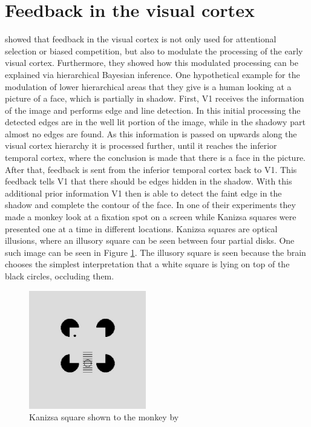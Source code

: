 \section{Feedback in the visual cortex}
\label{section:feedbackInVisualCortex}
\citet{HierachicalBayesVisualCortex} showed that feedback in the visual cortex is not only used for attentional selection or biased competition, but also to modulate the processing of the early visual cortex. Furthermore, they showed how this modulated processing can be explained via hierarchical Bayesian inference. One hypothetical example for the modulation of lower hierarchical areas that they give is a human looking at a picture of a face, which is partially in shadow. First, V1 receives the information of the image and performs edge and line detection. In this initial processing the detected edges are in the well lit portion of the image, while in the shadowy part almost no edges are found. As this information is passed on upwards along the visual cortex hierarchy it is processed further, until it reaches the inferior temporal cortex, where the conclusion is made that there is a face in the picture. After that, feedback is sent from the inferior temporal cortex back to V1. This feedback tells V1 that there should be edges hidden in the shadow. With this additional prior information V1 then is able to detect the faint edge in the shadow and complete the contour of the face. 
In one of their experiments they made a monkey look at a fixation spot on a screen while Kanizsa squares were presented one at a time in different locations. Kanizsa squares are optical illusions, where an illusory square can be seen between four partial disks. One such image can be seen in Figure \ref{fig:KanizsaSquare}. The illusory square is seen because the brain chooses the simplest interpretation that a white square is lying on top of the black circles, occluding them.
\begin{figure}
\centering
  \includegraphics[width=0.5\linewidth]{figures/kanizsaSquare.PNG}
  \caption{Kanizsa square shown to the monkey by \citet{HierachicalBayesVisualCortex}}
  \label{fig:KanizsaSquare}
\end{figure}
